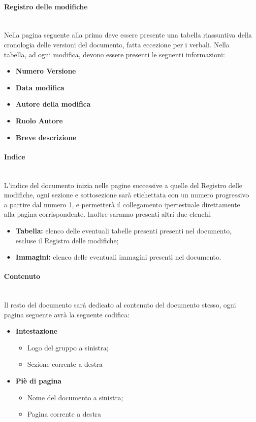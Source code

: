 \documentclass[11pt,a4paper]{article}
\begin{document}
	\paragraph{Registro delle modifiche}
	 	\noindent \\
	 	Nella pagina seguente alla prima deve essere presente una tabella riassuntiva della cronologia delle versioni del documento, fatta eccezione per i verbali. Nella tabella, ad ogni modifica, devono essere presenti le seguenti informazioni:
	
	\begin{itemize}
	    \item \textbf{Numero Versione}
		\item \textbf{Data modifica}
		\item \textbf{Autore della modifica}
		\item \textbf{Ruolo Autore}
		\item \textbf{Breve descrizione}
	\end{itemize}
	
	\paragraph{Indice}
	\noindent \\L'indice del documento inizia nelle pagine successive a quelle del Registro delle modifiche, ogni sezione e sottosezione sarà etichettata con un numero progressivo a partire dal numero 1, e permetterà il collegamento ipertestuale direttamente alla pagina corrispondente. Inoltre saranno presenti altri due elenchi:
	
	\begin{itemize}
	\item \textbf{Tabella:} elenco delle eventuali tabelle presenti presenti nel documento, escluse il Registro delle modifiche;
	\item  \textbf{Immagini:} elenco delle eventuali immagini presenti nel documento. 
	\end{itemize}
	
	\paragraph{Contenuto}
	\noindent \\ 
	Il resto del documento sarà dedicato al contenuto del documento stesso, ogni pagina seguente avrà la seguente codifica:
	\begin{itemize}
		\item \textbf{Intestazione}
		\begin{itemize}
			\item Logo del gruppo a sinistra;
			\item Sezione corrente a destra
		\end{itemize}
	
	\item \textbf{Piè di pagina} 
	\begin{itemize}
	\item Nome del documento a sinistra;
	\item Pagina corrente a destra
	\end{itemize}
\end{itemize}
	
\end{document}
